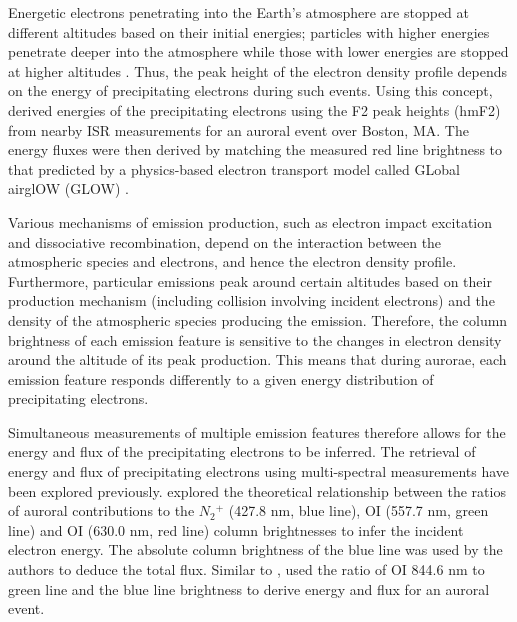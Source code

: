 \documentclass[crop=false,class=mitthesis,oneside,font=12pt]{standalone}
\begin{document}
Energetic electrons penetrating into the Earth's atmosphere are stopped at different altitudes based on their initial energies; particles with higher energies penetrate deeper into the atmosphere while those with lower energies are stopped at higher altitudes \citep{rees_1963}. Thus, the peak height of the electron density profile depends on the energy of precipitating electrons during such events.
Using this concept, \cite{pallamraju_2011} derived energies of the precipitating electrons using the F2 peak heights (hmF2) from nearby ISR measurements for an auroral event over Boston, MA. The energy fluxes were then derived by matching the measured red line brightness to that predicted by a physics-based electron transport model called GLobal airglOW (GLOW) \citep{solomon_1988,solomon1989630,bailey2002}.  

%
%


Various mechanisms of emission production, such as electron impact excitation and dissociative recombination, depend on the interaction between the atmospheric species and electrons, and hence the electron density profile. Furthermore, particular emissions peak around certain altitudes based on their production mechanism (including collision involving incident electrons) and the density of the atmospheric species producing the emission. Therefore, the column brightness of each emission feature is sensitive to the changes in electron density around the altitude of its peak production. This means that during aurorae, each emission feature responds differently to a given energy distribution of precipitating electrons. 

Simultaneous measurements of multiple emission features therefore allows for the energy and flux of the precipitating electrons to be inferred. The retrieval of energy and flux of precipitating electrons using multi-spectral measurements have been explored previously. \citet{rees_1974} explored the theoretical relationship between the ratios of auroral contributions to the $N{_2}{^+}$ (427.8 nm, blue line), OI (557.7 nm, green line) and OI (630.0 nm, red line) column brightnesses to infer the incident electron energy. The absolute column brightness of the blue line was used by the authors to deduce the total flux. Similar to \citet{rees_1974}, \citet{grubbs_compare} used the ratio of OI 844.6 nm to green line and the blue line brightness to derive energy and flux for an auroral event.
\end{document}
